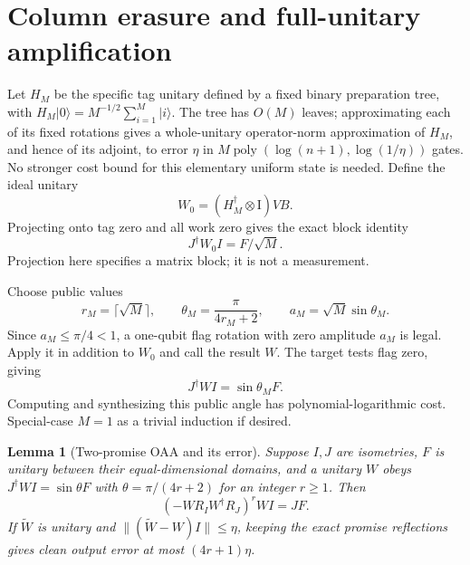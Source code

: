 \documentclass[11pt]{article}
\newtheorem{lemma}[theorem]{Lemma}
\theoremstyle{definition}
\newcommand{\ket}[1]{\lvert #1\rangle}
\newcommand{\norm}[1]{\lVert #1\rVert}
\newcommand{\Id}{\mathrm I}
\newcommand{\poly}{\operatorname{poly}}
\begin{document}
\section{Column erasure and full-unitary amplification}\label{sec:oaa}

Let $H_M$ be the specific tag unitary defined by a fixed binary preparation
tree, with $H_M\ket0=M^{-1/2}\sum_{i=1}^M\ket i$. The tree has $O(M)$
leaves; approximating each of its fixed rotations gives a whole-unitary
operator-norm approximation of $H_M$, and hence of its adjoint, to error
$\eta$ in $M\poly(\log(n+1),\log(1/\eta))$ gates.
No stronger cost bound for this elementary uniform
state is needed. Define the ideal unitary
\[
 W_0=(H_M^\dagger\otimes\Id)VB.
\]
Projecting onto tag zero and all work zero gives the exact block identity
\begin{equation}\label{eq:block}
 J^\dagger W_0 I=F/\sqrt M.
\end{equation}
Projection here specifies a matrix block; it is not a measurement.

Choose public values
\begin{equation}\label{eq:attenuate}
 r_M=\lceil\sqrt M\rceil,\qquad
 \theta_M=\frac{\pi}{4r_M+2},\qquad a_M=\sqrt M\sin\theta_M.
\end{equation}
Since $a_M\le\pi/4<1$, a one-qubit flag rotation with zero amplitude $a_M$
is legal. Apply it in addition to $W_0$ and call the result $W$.
The target tests flag zero, giving
\begin{equation}\label{eq:attenuated}
 J^\dagger W I=\sin\theta_M F.
\end{equation}
Computing and synthesizing this public angle has polynomial-logarithmic
cost. Special-case $M=1$ as a trivial induction if desired.

\begin{lemma}[Two-promise OAA and its error]\label{lem:oaa}
Suppose $I,J$ are isometries, $F$ is unitary between their equal-dimensional
domains, and a unitary $W$ obeys $J^\dagger WI=\sin\theta F$ with
$\theta=\pi/(4r+2)$ for an integer $r\ge1$. Then
\begin{equation}\label{eq:exactoaa}
 (-WR_IW^\dagger R_J)^r WI=JF.
\end{equation}
If $\widetilde W$ is unitary and
$\norm{(\widetilde W-W)I}\le\eta$, keeping the exact promise reflections
gives clean output error at most $(4r+1)\eta$.
\end{lemma}
\end{document}
